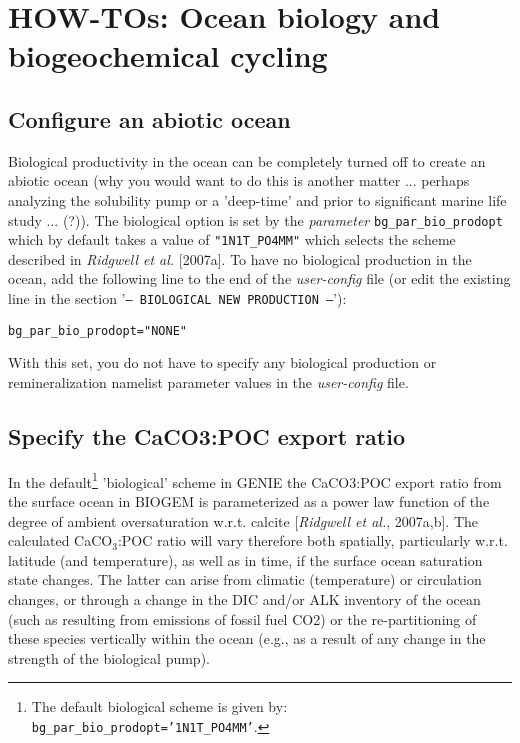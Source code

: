 \documentclass[10pt,twoside]{article}
\begin{document}
\newpage
\section{HOW-TOs: Ocean biology and biogeochemical cycling}\label{how-to-4}


\subsection{Configure an abiotic ocean}\label{Have an abiotic ocean}

Biological productivity in the ocean can be completely turned off to create an abiotic ocean (why you would want to do this is another matter ... perhaps analyzing the solubility pump or a 'deep-time' and prior to significant marine life study ... (?)). The biological option is set by the \textit{parameter} \texttt{bg\_par\_bio\_prodopt} which by default takes a value of \texttt{"1N1T\_PO4MM"} which selects the scheme described in \textit{Ridgwell et al.} [2007a]. To have no biological production in the ocean, add the following line to the end of the \textit{user-config} file (or edit the existing line in the section '\texttt{--- BIOLOGICAL NEW PRODUCTION ---}'):
\vspace{-11pt}\begin{verbatim}
bg_par_bio_prodopt="NONE"
\end{verbatim}\vspace{-5.5pt}
With this set, you do not have to specify any biological production or remineralization namelist parameter values in the \textit{user-config} file.



\subsection{Specify the CaCO3:POC export ratio}\label{CaCO3:POCrainratio}

In the default\footnote{The default biological scheme is given by: \texttt{bg\_par\_bio\_prodopt='1N1T\_PO4MM'}.} 'biological' scheme in GENIE the CaCO3:POC export ratio from the surface ocean in BIOGEM is parameterized as a power law function of the degree of ambient oversaturation w.r.t. calcite [\textit{Ridgwell et al.}, 2007a,b]. The calculated CaCO\begin{math}_3\end{math}:POC ratio will vary therefore both spatially, particularly w.r.t. latitude (and temperature), as well as in time, if the surface ocean saturation state changes. The latter can arise from climatic (temperature) or circulation changes, or through a change in the DIC and/or ALK inventory of the ocean (such as resulting from emissions of fossil fuel CO2) or the re-partitioning of these species vertically within the ocean (e.g., as a result of any change in the strength of the biological pump).
\end{document}
